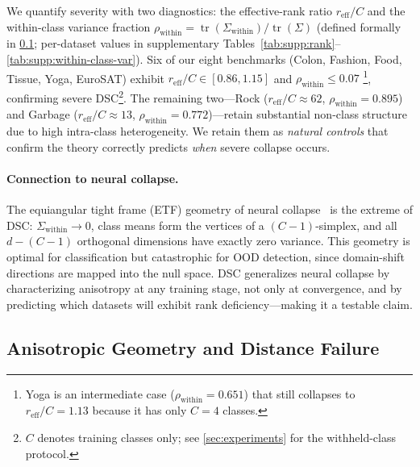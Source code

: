 \documentclass[runningheads]{llncs}
\begin{document}
We quantify severity with two diagnostics:
the effective-rank ratio $r_{\mathrm{eff}}/C$ and the within-class variance fraction
$\rho_{\mathrm{within}} = \operatorname{tr}(\Sigma_{\mathrm{within}}) / \operatorname{tr}(\Sigma)$
(defined formally in \cref{sec:theory:aniso}; per-dataset values in supplementary Tables~\ref{tab:supp:rank}--\ref{tab:supp:within-class-var}).
Six of our eight benchmarks (Colon, Fashion, Food, Tissue, Yoga, EuroSAT) exhibit
$r_{\mathrm{eff}}/C \in [0.86, 1.15]$ and $\rho_{\mathrm{within}} \le 0.07$%
\footnote{Yoga is an intermediate case ($\rho_{\mathrm{within}} = 0.651$) that still collapses to $r_{\mathrm{eff}}/C = 1.13$ because it has only $C{=}4$ classes.},
confirming severe DSC\footnote{$C$ denotes training classes only; see \cref{sec:experiments} for the withheld-class protocol.}.
The remaining two---Rock ($r_{\mathrm{eff}}/C \approx 62$, $\rho_{\mathrm{within}} = 0.895$)
and Garbage ($r_{\mathrm{eff}}/C \approx 13$, $\rho_{\mathrm{within}} = 0.772$)---retain
substantial non-class structure due to high intra-class heterogeneity.
We retain them as \emph{natural controls} that confirm the theory correctly predicts
\emph{when} severe collapse occurs.

\paragraph{Connection to neural collapse.}
The equiangular tight frame (ETF) geometry of neural collapse~\cite{Papyan2020nc,Zhu2021nc} is the extreme of DSC: $\Sigma_{\mathrm{within}} \to 0$, class means form the vertices of a $(C{-}1)$-simplex, and all $d - (C{-}1)$ orthogonal dimensions have exactly zero variance.
This geometry is optimal for classification but catastrophic for OOD detection, since domain-shift directions are mapped into the null space.
DSC generalizes neural collapse by characterizing anisotropy at any training stage, not only at convergence, and by predicting which datasets will exhibit rank deficiency---making it a testable claim.

\subsection{Anisotropic Geometry and Distance Failure}
\label{sec:theory:aniso}
\end{document}
